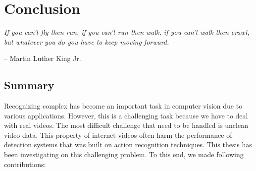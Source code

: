 \chapter{Conclusion}
\label{chapter6}

\epigraph{\textit{If you can't fly then run, if you can't run then walk, if you can't walk then crawl, but whatever you do you have to keep moving forward.}}{ -- Martin Luther King Jr.}

\ifpdf
    \graphicspath{{Chapter6/Figs/Raster/}{Chapter6/Figs/PDF/}{Chapter6/Figs/}}
\else
    \graphicspath{{Chapter6/Figs/Vector/}{Chapter6/Figs/}}
\fi

\section{Summary}

Recognizing complex has become an important task in computer vision due to various applications. However, this is a challenging task because we have to deal with real videos. The most difficult challenge that need to be handled is unclean video data. This property of internet videos often harm the performance of detection systems that was built on action recognition techniques. This thesis has been investigating on this challenging problem. To this end, we made following contributions:

